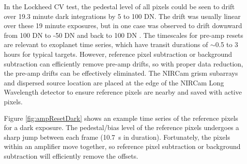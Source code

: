 \documentclass[]{aastex62}
\begin{document}
In the Lockheed CV test, the pedestal level of all pixels could be seen to drift over 19.3 minute dark integrations by 5 to 100 DN.
The drift was usually linear over these 19 minute exposures, but in one case was observed to drift downward from 100 DN to -50 DN and back to 100 DN \citep{robberto2014refPixPreAmp}.
The timescales for pre-amp resets are relevant to exoplanet time series, which have transit durations of $\sim$0.5 to 3 hours for typical targets.
However, reference pixel subtraction or background subtraction can efficiently remove pre-amp drifts, so with proper data reduction, the pre-amp drifts can be effectively eliminated.
The NIRCam grism subarrays and dispersed source location are placed at the edge of the NIRCam Long Wavelength detector to ensure reference pixels are nearby and saved with active pixels.

Figure \ref{fig:ampResetDark} shows an example time series of the reference pixels for a dark exposure.
The pedestal/bias level of the reference pixels undergoes a sharp jump between each frame (10.7~s in duration).
Fortunately, the pixels within an amplifier move together, so reference pixel subtraction or background subtraction will efficiently remove the offsets.
\end{document}
